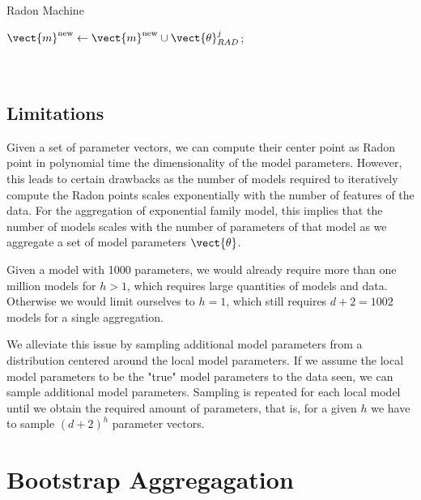 \begin{algo}[float]{Radon Machine}
\begin{algorithm}[H]
\begin{algorithmic}[1]
{{                $\vect{m}^{\text{new}}\leftarrow \vect{m}^{\text{new}} \cup \vect{\theta}_{RAD}^j$;  \\
            } 
            \ENDFOR
            }\\
            \\
            \ENDFOR
        \end{algorithmic}
    \end{algorithm}
\end{algo}

\subsection{Limitations}
Given a set of parameter vectors, we can compute their center point as Radon point in polynomial time \wrt the dimensionality of the model parameters.
However, this leads to certain drawbacks as the number of models required to iteratively compute the Radon points scales exponentially with the number of features of the data.
For the aggregation of exponential family model, this implies that the number of models scales with the number of parameters of that model as we aggregate a set of model parameters $\vect{\theta}$.

Given a model with 1000 parameters, we would already require more than one million models for $h > 1$, which requires large quantities of models and data.
Otherwise we would limit ourselves to $h=1$, which still requires $d+2 = 1002$ models for a single aggregation.

We alleviate this issue by sampling additional model parameters from a distribution centered around the local model parameters. 
If we assume the local model parameters to be the "true" model parameters \wrt to the data seen, we can sample additional model parameters.
Sampling is repeated for each local model until we obtain the required amount of parameters, that is, for a given $h$ we have to sample $(d+2)^h$ parameter vectors.


\section{Bootstrap Aggregagation}

